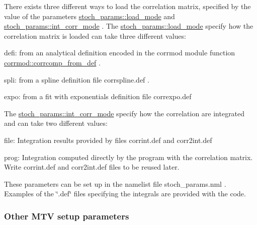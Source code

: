 There exists three different ways to load the correlation matrix, specified by the value of the parameters \hyperlink{namespacestoch__params_ac61a48744a1bb015b5148c421837fbe7}{stoch\+\_\+params\+::load\+\_\+mode} and \hyperlink{namespacestoch__params_ab901db3992a4df88db5a67fdd7be6ac6}{stoch\+\_\+params\+::int\+\_\+corr\+\_\+mode} . The \hyperlink{namespacestoch__params_ac61a48744a1bb015b5148c421837fbe7}{stoch\+\_\+params\+::load\+\_\+mode} specify how the correlation matrix is loaded can take three different values\+:
\begin{DoxyItemize}
\item \textquotesingle{}defi\textquotesingle{}\+: from an analytical definition encoded in the corrmod module function \hyperlink{namespacecorrmod_a52bbdab69c73b4313857d71c07cb3164}{corrmod\+::corrcomp\+\_\+from\+\_\+def} .
\item \textquotesingle{}spli\textquotesingle{}\+: from a spline definition file \textquotesingle{}corrspline.\+def\textquotesingle{} .
\item \textquotesingle{}expo\textquotesingle{}\+: from a fit with exponentials definition file \textquotesingle{}correxpo.\+def\textquotesingle{}
\end{DoxyItemize}

The \hyperlink{namespacestoch__params_ab901db3992a4df88db5a67fdd7be6ac6}{stoch\+\_\+params\+::int\+\_\+corr\+\_\+mode} specify how the correlation are integrated and can take two different values\+:
\begin{DoxyItemize}
\item \textquotesingle{}file\textquotesingle{}\+: Integration results provided by files \textquotesingle{}corrint.\+def\textquotesingle{} and \textquotesingle{}corr2int.\+def\textquotesingle{}
\item \textquotesingle{}prog\textquotesingle{}\+: Integration computed directly by the program with the correlation matrix. Write \textquotesingle{}corrint.\+def\textquotesingle{} and \textquotesingle{}corr2int.\+def\textquotesingle{} files to be reused later.
\end{DoxyItemize}

These parameters can be set up in the namelist file stoch\+\_\+params.\+nml . Examples of the \char`\"{}.\+def\char`\"{} files specifying the integrals are provided with the code.

\subsubsection*{Other M\+TV setup parameters}

